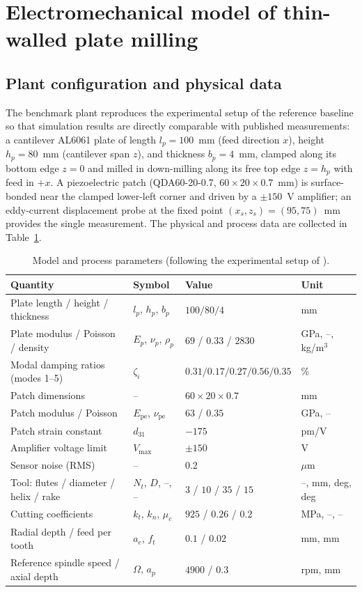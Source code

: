 \documentclass[preprint,12pt]{elsarticle}
\begin{document}
\section{Electromechanical model of thin-walled plate milling}
\label{sec:model}

\subsection{Plant configuration and physical data}
\label{sec:plant}

The benchmark plant reproduces the experimental setup of the reference
baseline \cite{du2024robust} so that simulation results are directly
comparable with published measurements: a cantilever AL6061 plate of
length $l_p = 100$~mm (feed direction $x$), height $h_p = 80$~mm
(cantilever span $z$), and thickness $b_p = 4$~mm, clamped along its
bottom edge $z = 0$ and milled in down-milling along its free top edge
$z = h_p$ with feed in $+x$. A piezoelectric patch (QDA60-20-0.7,
$60 \times 20 \times 0.7$~mm) is surface-bonded near the clamped
lower-left corner and driven by a $\pm 150$~V amplifier; an eddy-current
displacement probe at the fixed point $(x_s, z_s) = (95, 75)$~mm
provides the single measurement. The physical and process data are
collected in Table~\ref{tab:params}.

\begin{table}[t]
\centering
\caption{Model and process parameters (following the experimental setup
of \cite{du2024robust}).}
\label{tab:params}
\begin{tabular}{llll}
\toprule
Quantity & Symbol & Value & Unit \\
\midrule
Plate length / height / thickness & $l_p$, $h_p$, $b_p$ & $100 / 80 / 4$ & mm \\
Plate modulus / Poisson / density & $E_p$, $\nu_p$, $\rho_p$ & $69$ / $0.33$ / $2830$ & GPa, --, kg/m$^3$ \\
Modal damping ratios (modes 1--5) & $\zeta_i$ & $0.31/0.17/0.27/0.56/0.35$ & \% \\
Patch dimensions & -- & $60 \times 20 \times 0.7$ & mm \\
Patch modulus / Poisson & $E_{\mathrm{pe}}$, $\nu_{\mathrm{pe}}$ & $63$ / $0.35$ & GPa, -- \\
Patch strain constant & $d_{31}$ & $-175$ & pm/V \\
Amplifier voltage limit & $V_{\max}$ & $\pm 150$ & V \\
Sensor noise (RMS) & -- & $0.2$ & $\mu$m \\
Tool: flutes / diameter / helix / rake & $N_t$, $D$, --, -- & $3$ / $10$ / $35$ / $15$ & --, mm, deg, deg \\
Cutting coefficients & $k_t$, $k_n$, $\mu_c$ & $925$ / $0.26$ / $0.2$ & MPa, --, -- \\
Radial depth / feed per tooth & $a_e$, $f_t$ & $0.1$ / $0.02$ & mm, mm \\
Reference spindle speed / axial depth & $\Omega$, $a_p$ & $4900$ / $0.3$ & rpm, mm \\
\bottomrule
\end{tabular}
\end{table}
\end{document}
